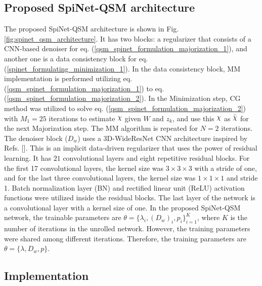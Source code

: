 \documentclass[sn-vancouver,Numbered]{sn-jnl}%
\DeclareRobustCommand{\rchi}{{\mathpalette\irchi\relax}}
\newcommand{\irchi}[2]{\raisebox{\depth}{$#1\chi$}}
\begin{document}
\subsection{Proposed SpiNet-QSM architecture}
The proposed SpiNet-QSM architecture is shown in Fig. \ref{fig:spinet_qsm_architecture}. It has two blocks: a regularizer that consists of a CNN-based denoiser for eq. (\ref{qsm_spinet_formulation_majorization_1}), and another one is a data consistency block for eq. (\ref{spinet_formulating_minimization_1}). In the data consistency block, MM implementation is performed utilizing eq. (\ref{qsm_spinet_formulation_majorization_1}) to eq. (\ref{qsm_spinet_formulation_majorization_2}). In the Minimization step, CG method was utilized to solve eq. (\ref{qsm_spinet_formulation_majorization_2}) with $M_1=25$ iterations to estimate $\rchi$ given $W$ and $z_{k}$, and use this $\rchi$ as $\bar{\rchi}$ for the next Majorization step. The MM algorithm is repeated for $N=2$ iterations. The denoiser block ($D_{w}$) uses a 3D-WideResNet CNN architecture inspired by Refs. [\cite{lai2020learned,he2016deep}]. This is an implicit data-driven regularizer that uses the power of residual learning. It has $21$ convolutional layers and eight repetitive residual blocks. For the first 17 convolutional layers, the kernel size was $3 \times 3 \times 3$ with a stride of one, and for the last three convolutional layers, the kernel size was $1 \times 1 \times 1$ and stride 1. Batch normalization layer (BN) and rectified linear unit (ReLU) activation functions were utilized inside the residual blocks. The last layer of the network is a convolutional layer with a kernel size of one. In the proposed SpiNet-QSM network, the trainable parameters are $\theta=\{\lambda _{i},(D_{w})_{i},p_{i}\}_{i=1}^{K}$, where $K$ is the number of iterations in the unrolled network. However, the training parameters were shared among different iterations. Therefore, the training parameters are $\theta=\{\lambda ,D_w,p\}$.


\subsection{Implementation}
\end{document}
